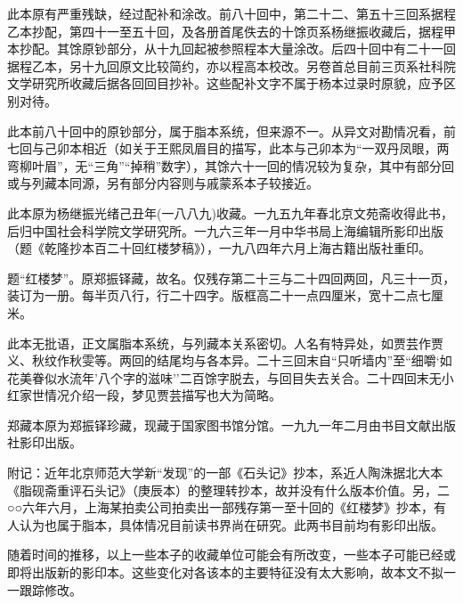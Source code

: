 此本原有严重残缺，经过配补和涂改。前八十回中，第二十二、第五十三回系据程乙本抄配，第四十一至五十回，及各册首尾佚去的十馀页系杨继振收藏后，据程甲本抄配。其馀原钞部分，从十九回起被参照程本大量涂改。后四十回中有二十一回据程乙本，另十九回原文比较简约，亦以程高本校改。另卷首总目前三页系社科院文学研究所收藏后据各回回目抄补。这些配补文字不属于杨本过录时原貌，应予区别对待。

此本前八十回中的原钞部分，属于脂本系统，但来源不一。从异文对勘情况看，前七回与己卯本相近（如关于王熙凤眉目的描写，此本与己卯本为``一双丹凤眼，两弯柳叶眉''，无``三角''``掉稍''数字），其馀六十一回的情况较为复杂，其中有部分回或与列藏本同源，另有部分内容则与戚蒙系本子较接近。

此本原为杨继振光绪己丑年(一八八九)收藏。一九五九年春北京文苑斋收得此书，后归中国社会科学院文学研究所。一九六三年一月中华书局上海编辑所影印出版（题《乾隆抄本百二十回红楼梦稿》），一九八四年六月上海古籍出版社重印。

{}

题``红楼梦''。原郑振铎藏，故名。仅残存第二十三与二十四回两回，凡三十一页，装订为一册。每半页八行，行二十四字。版框高二十一点四厘米，宽十二点七厘米。

此本无批语，正文属脂本系统，与列藏本关系密切。人名有特异处，如贾芸作贾义、秋纹作秋雯等。两回的结尾均与各本异。二十三回末自``只听墙内''至``细嚼`如花美眷似水流年'八个字的滋味''二百馀字脱去，与回目失去关合。二十四回末无小红家世情况介绍一段，梦见贾芸描写也大为简略。

郑藏本原为郑振铎珍藏，现藏于国家图书馆分馆。一九九一年二月由书目文献出版社影印出版。

附记：近年北京师范大学新``发现''的一部《石头记》抄本，系近人陶洙据北大本《脂砚斋重评石头记》（庚辰本）的整理转抄本，故并没有什么版本价值。另，二○○六年六月，上海某拍卖公司拍卖出一部残存第一至十回的《红楼梦》抄本，有人认为也属于脂本，具体情况目前读书界尚在研究。此两书目前均有影印出版。

随着时间的推移，以上一些本子的收藏单位可能会有所改变，一些本子可能已经或即将出版新的影印本。这些变化对各该本的主要特征没有太大影响，故本文不拟一一跟踪修改。
